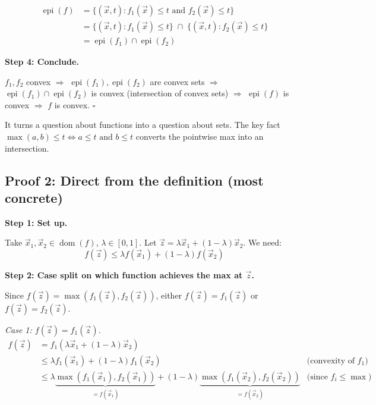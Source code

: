 \documentclass[10pt]{article}
\theoremstyle{definition}
\theoremstyle{plain}
\DeclareMathOperator{\dom}{dom}
\DeclareMathOperator{\epi}{epi}
\begin{document}
\begin{align*}
    \epi(f) &= \{(\vec{x}, t) : f_1(\vec{x}) \le t \text{ and } f_2(\vec{x}) \le t\} \\
            &= \{(\vec{x}, t) : f_1(\vec{x}) \le t\} \;\cap\; \{(\vec{x}, t) : f_2(\vec{x}) \le t\} \\
            &= \epi(f_1) \cap \epi(f_2)
\end{align*}

\textbf{Step 4: Conclude.}

$f_1, f_2$ convex $\Rightarrow$ $\epi(f_1), \epi(f_2)$ are convex sets $\Rightarrow$ $\epi(f_1) \cap \epi(f_2)$ is convex (intersection of convex sets) $\Rightarrow$ $\epi(f)$ is convex $\Rightarrow$ $f$ is convex. $\square$

\begin{tcolorbox}[colframe=black!50, title={\small Why this proof is nice}]
It turns a question about functions into a question about sets. The key fact $\max(a,b) \le t \iff a \le t \text{ and } b \le t$ converts the pointwise max into an intersection.
\end{tcolorbox}

\subsection{Proof 2: Direct from the definition (most concrete)}

\textbf{Step 1: Set up.}

Take $\vec{x}_1, \vec{x}_2 \in \dom(f)$, $\lambda \in [0,1]$. Let $\vec{z} = \lambda \vec{x}_1 + (1-\lambda)\vec{x}_2$. We need:
\[
    f(\vec{z}) \le \lambda f(\vec{x}_1) + (1-\lambda) f(\vec{x}_2)
\]

\textbf{Step 2: Case split on which function achieves the max at $\vec{z}$.}

Since $f(\vec{z}) = \max(f_1(\vec{z}), f_2(\vec{z}))$, either $f(\vec{z}) = f_1(\vec{z})$ or $f(\vec{z}) = f_2(\vec{z})$.

\textit{Case 1: $f(\vec{z}) = f_1(\vec{z})$.}
\begin{align*}
    f(\vec{z}) &= f_1(\lambda \vec{x}_1 + (1-\lambda)\vec{x}_2) \\
               &\le \lambda f_1(\vec{x}_1) + (1-\lambda) f_1(\vec{x}_2) & \text{(convexity of $f_1$)}\\
               &\le \lambda \underbrace{\max(f_1(\vec{x}_1), f_2(\vec{x}_1))}_{= f(\vec{x}_1)} + (1-\lambda) \underbrace{\max(f_1(\vec{x}_2), f_2(\vec{x}_2))}_{= f(\vec{x}_2)} & \text{(since $f_i \le \max$)}
\end{align*}
\end{document}
